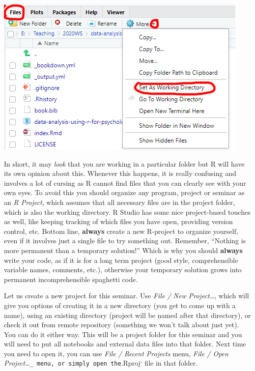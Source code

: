 \documentclass[
]{book}
\begin{document}
\begin{center}\includegraphics[width=1\linewidth]{images/setwd-gui} \end{center}

In short, it may \emph{look} that you are working in a particular folder but R will have its own opinion about this. Whenever this happens, it is really confusing and involves a lot of cursing as R cannot find files that you can clearly see with your own eyes. To avoid this you should organize any program, project or seminar as an \emph{R Project}, which assumes that all necessary files are in the project folder, which is also the working directory. R Studio has some nice project-based touches as well, like keeping tracking of which files you have open, providing version control, etc. Bottom line, \textbf{always} create a new R-project to organize yourself, even if it involves just a single file to try something out. Remember, ``Nothing is more permanent than a temporary solution!'' Which is why you should \textbf{always} write your code, as if it is for a long term project (good style, comprehensible variable names, comments, etc.), otherwise your temporary solution grows into permanent incomprehensible spaghetti code.

Let us create a new project for this seminar. Use \emph{File / New Project\ldots{}}, which will give you options of creating it in a new directory (you get to come up with a name), using an existing directory (project will be named after that directory), or check it out from remote repository (something we won't talk about just yet). You can do it either way. This will be a project folder for this seminar and you will need to put all notebooks and external data files into that folder. Next time you need to open it, you can use \emph{File / Recent Projects} menu, \emph{File / Open Project\ldots{}}\texttt{\_\ menu,\ or\ simply\ open\ the}.Rproj` file in that folder.
\end{document}
